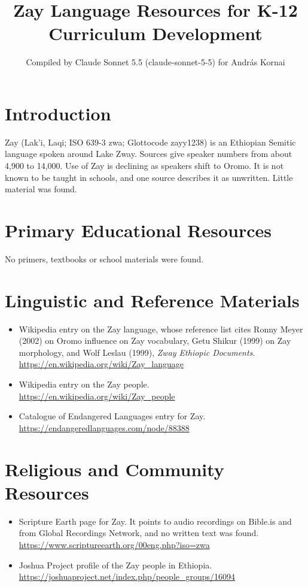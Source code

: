 \documentclass[12pt]{article}
\title{Zay Language Resources for K-12 Curriculum Development}
\author{Compiled by Claude Sonnet 5.5 (claude-sonnet-5-5) for Andr\'as Kornai}
\date{}
\begin{document}
\maketitle

\section{Introduction}
Zay (Lak'i, Laqi; ISO 639-3 zwa; Glottocode zayy1238) is an Ethiopian Semitic language spoken around Lake Zway. Sources give speaker numbers from about 4,900 to 14,000. Use of Zay is declining as speakers shift to Oromo. It is not known to be taught in schools, and one source describes it as unwritten. Little material was found.

\section{Primary Educational Resources}
No primers, textbooks or school materials were found.

\section{Linguistic and Reference Materials}
\begin{itemize}
\item Wikipedia entry on the Zay language, whose reference list cites Ronny Meyer (2002) on Oromo influence on Zay vocabulary, Getu Shikur (1999) on Zay morphology, and Wolf Leslau (1999), \textit{Zway Ethiopic Documents}. \url{https://en.wikipedia.org/wiki/Zay_language}
\item Wikipedia entry on the Zay people. \url{https://en.wikipedia.org/wiki/Zay_people}
\item Catalogue of Endangered Languages entry for Zay. \url{https://endangeredlanguages.com/node/88388}
\end{itemize}

\section{Religious and Community Resources}
\begin{itemize}
\item Scripture Earth page for Zay. It points to audio recordings on Bible.is and from Global Recordings Network, and no written text was found. \url{https://www.scriptureearth.org/00eng.php?iso=zwa}
\item Joshua Project profile of the Zay people in Ethiopia. \url{https://joshuaproject.net/index.php/people_groups/16094}
\end{itemize}
\end{document}
